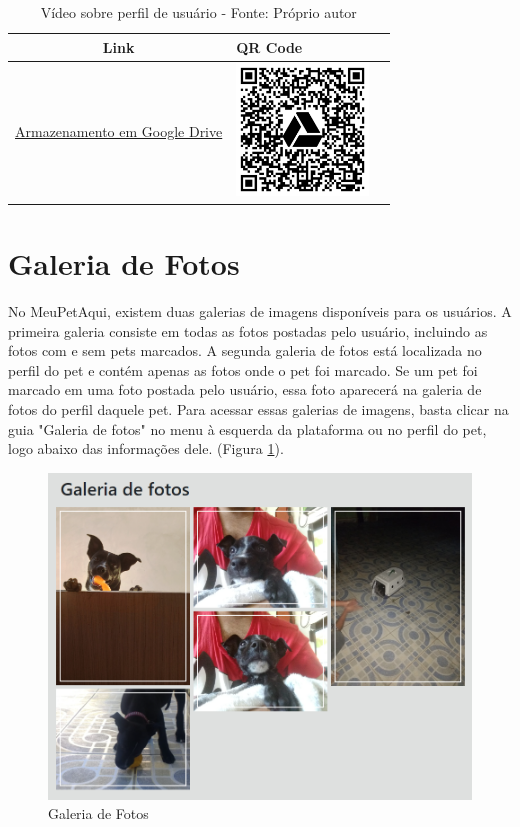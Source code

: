 \begin{table}[htbp]
\centering
\renewcommand{\arraystretch}{1.5}
\begin{tabular}{|c|>{\centering\arraybackslash}m{6cm}|c|}
\hline
\textbf{Link} & \textbf{QR Code} \\
\hline
\href{https://drive.google.com/file/d/19kmkY3OLrkkcErTuMwM3Cx5TxKMiL3cM/view?usp=drive_link}{Armazenamento em Google Drive} & \includegraphics[width=3.5cm]{arquivos/ImgLinks/perfilUser.png} \\
\hline
\end{tabular}
\caption*{Vídeo sobre perfil de usuário - Fonte: Próprio autor}
\end{table}

\newpage
\section{Galeria de Fotos}
\label{sec:GaleriaDeFotos}
No MeuPetAqui, existem duas galerias de imagens disponíveis para os usuários. A primeira galeria consiste em todas as fotos postadas pelo usuário, incluindo as fotos com e sem pets marcados. A segunda galeria de fotos está localizada no perfil do pet e contém apenas as fotos onde o pet foi marcado. Se um pet foi marcado em uma foto postada pelo usuário, essa foto aparecerá na galeria de fotos do perfil daquele pet. Para acessar essas galerias de imagens, basta clicar na guia "Galeria de fotos" no menu à esquerda da plataforma ou no perfil do pet, logo abaixo das informações dele. (Figura \ref{fig:GaleriaDeFotosUsuário}).

\begin{figure}[htb]
     \centering
     \includegraphics[width=12cm]{arquivos/Figuras/image2.png}
     \caption{Galeria de Fotos}
     \label{fig:GaleriaDeFotosUsuário}
\end{figure}

